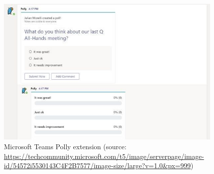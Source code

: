 \begin{figure}[h]
    \centering
    \includegraphics[width=\textwidth]{appendices/ms_teams/ms_teams_images/mircosoft_polly.jpg}
    \caption{Microsoft Teams Polly extension (source: \url{https://techcommunity.microsoft.com/t5/image/serverpage/image-id/54572i5530143C4F2B7577/image-size/large?v=1.0&px=999})}
    \label{fig:my_label}
\end{figure}
